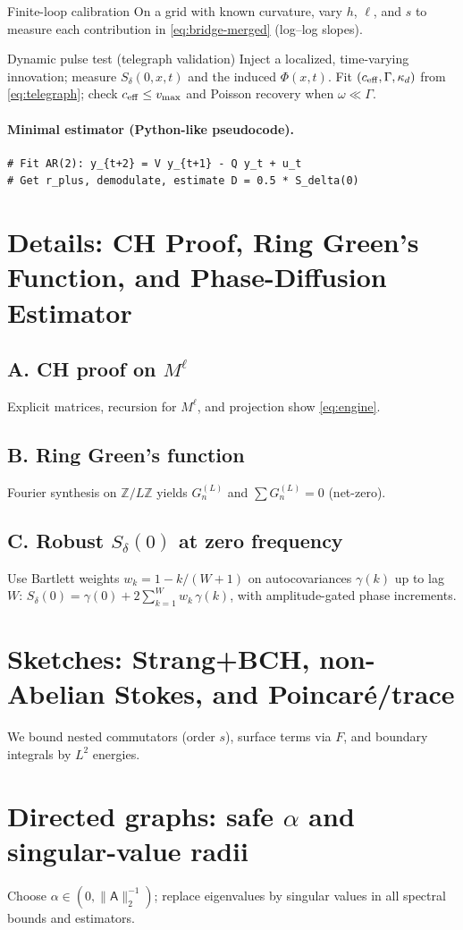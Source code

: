 \documentclass[11pt]{article}
\newcommand{\Adj}{\mathsf{A}}
\begin{document}
\begin{mybox}{Finite-loop calibration}
On a grid with known curvature, vary $h$, $\ell$, and $s$ to measure each contribution in \eqref{eq:bridge-merged} (log--log slopes). 
\end{mybox}

\begin{mybox}{Dynamic pulse test (telegraph validation)}
Inject a localized, time-varying innovation; measure $S_\delta(0,x,t)$ and the induced $\Phi(x,t)$.
Fit $(c_{\rm eff},\Gamma,\kappa_d)$ from \eqref{eq:telegraph}; check $c_{\rm eff}\le v_{\max}$ and
Poisson recovery when $\omega\ll\Gamma$.
\end{mybox}
  
\paragraph{Minimal estimator (Python-like pseudocode).}
\begin{verbatim}
# Fit AR(2): y_{t+2} = V y_{t+1} - Q y_t + u_t
# Get r_plus, demodulate, estimate D = 0.5 * S_delta(0)
\end{verbatim}


\appendix
\section{Details: CH Proof, Ring Green's Function, and Phase-Diffusion Estimator}
\subsection*{A. CH proof on $M^\ell$}
Explicit matrices, recursion for $M^\ell$, and projection show \eqref{eq:engine}.

\subsection*{B. Ring Green's function}
Fourier synthesis on $\mathbb Z/L\mathbb Z$ yields $G^{(L)}_n$ and $\sum G^{(L)}_n=0$ (net-zero).

\subsection*{C. Robust $S_\delta(0)$ at zero frequency}
Use Bartlett weights $w_k=1-k/(W+1)$ on autocovariances $\gamma(k)$ up to lag $W$:
$S_\delta(0)=\gamma(0)+2\sum_{k=1}^{W} w_k\,\gamma(k)$, with amplitude-gated phase increments.

\section{Sketches: Strang+BCH, non-Abelian Stokes, and Poincar\'e/trace}
We bound nested commutators (order $s$), surface terms via $F$, and boundary integrals by $L^2$ energies.

\section{Directed graphs: safe $\alpha$ and singular-value radii}
Choose $\alpha\in(0,\|\Adj\|_2^{-1})$; replace eigenvalues by singular values in all spectral bounds and estimators.
\end{document}
